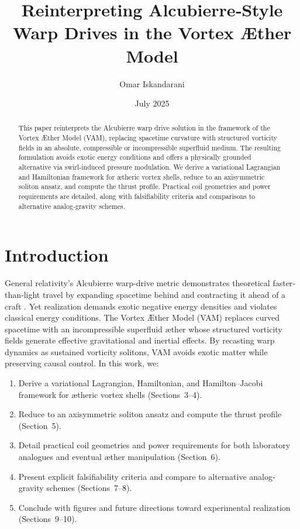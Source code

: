 \documentclass[preprint,notitlepage]{revtex4-2}
\title{Reinterpreting Alcubierre‐Style Warp Drives in the Vortex Æther Model}
\author{Omar Iskandarani}
\date{July 2025}
\begin{document}
\maketitle

\begin{abstract}
This paper reinterprets the Alcubierre warp drive solution in the framework of the Vortex Æther Model (VAM), replacing spacetime curvature with structured vorticity fields in an absolute, compressible or incompressible superfluid medium. The resulting formulation avoids exotic energy conditions and offers a physically grounded alternative via swirl-induced pressure modulation. We derive a variational Lagrangian and Hamiltonian framework for ætheric vortex shells, reduce to an axisymmetric soliton ansatz, and compute the thrust profile. Practical coil geometries and power requirements are detailed, along with falsifiability criteria and comparisons to alternative analog‐gravity schemes.

\end{abstract}



\section{Introduction}
    General relativity’s Alcubierre warp‐drive metric demonstrates theoretical faster‐than‐light travel by expanding spacetime behind and contracting it ahead of a craft \cite{alcubierre1994warp}. Yet realization demands exotic negative energy densities and violates classical energy conditions. The Vortex Æther Model (VAM) replaces curved spacetime with an incompressible superfluid æther whose structured vorticity fields generate effective gravitational and inertial effects. By recasting warp dynamics as sustained vorticity solitons, VAM avoids exotic matter while preserving causal control. In this work, we:
    \begin{enumerate}
      \item Derive a variational Lagrangian, Hamiltonian, and Hamilton–Jacobi framework for ætheric vortex shells (Sections~3–4).
      \item Reduce to an axisymmetric soliton ansatz and compute the thrust profile (Section~5).
      \item Detail practical coil geometries and power requirements for both laboratory analogues and eventual æther manipulation (Section~6).
      \item Present explicit falsifiability criteria and compare to alternative analog‐gravity schemes (Sections~7–8).
      \item Conclude with figures and future directions toward experimental realization (Sections~9–10).
    \end{enumerate}
\end{document}
